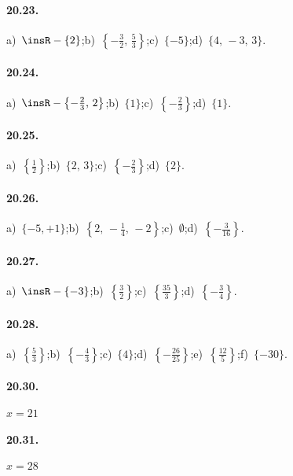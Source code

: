 \begin{multicols}{2}
\paragraph{20.23.}
a)~$\insR-\{2\}$;\quad b)~$\left\{-{\frac{3}{2}}\text{,~}\frac{5}{3}\right\}$;\quad c)~$\{-5\}$;\quad d)~$\{4\text{,~}-3\text{,~}3\}$.

\paragraph{20.24.}
a)~$\insR-\left\{-{\frac{2}{3}}\text{,~}2\right\}$;\quad b)~$\{1\}$;\quad c)~$\left\{-{\frac{2}{3}}\right\}$;\quad d)~$\{1\}$.

\paragraph{20.25.}
a)~$\left\{\frac{1}{2}\right\}$;\quad b)~$\{2\text{,~}3\}$;\quad c)~$\left\{-\frac{2}{3}\right\}$;\quad d)~$\{2\}$.

\paragraph{20.26.}
a)~$\{-5,+1\}$;\quad b)~$\left\{2\text{,~}-\frac{1}{4}\text{,~}-2\right\}$;\quad c)~$\emptyset$;\quad d)~$\left\{-{\frac{3}{16}}\right\}$.

\paragraph{20.27.}
a)~$\insR-\{-3\}$;\quad b)~$\left\{\frac{3}{2}\right\}$;\quad c)~$\left\{\frac{35}{3}\right\}$;\quad d)~$\left\{-{\frac{3}{4}}\right\}$.

\paragraph{20.28.}
a)~$\left\{\frac{5}{3}\right\}$;\quad b)~$\left\{-\frac{4}{3}\right\}$;\quad c)~$\{4\}$;\quad d)~$\left\{-{\frac{26}{25}}\right\}$;\quad e)~$\left\{\frac{12}{5}\right\}$;\quad f)~$\{-30\}$.

\paragraph{20.30.} $x=21$

\paragraph{20.31.} $x=28$
\end{multicols}
